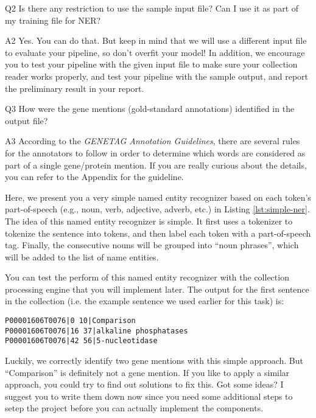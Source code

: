 \begin{qa}
\item[Q2] Is there any restriction to use the sample input file? Can I use it
as part of my training file for NER?

\item[A2] Yes. You can do that. But keep in mind that we will use a different
input file to evaluate your pipeline, so don't overfit your model! In addition,
we encourage you to test your pipeline with the given input file to make sure
your collection reader works properly, and test your pipeline with the sample
output, and report the preliminary result in your report.

\item[Q3] How were the gene mentions (gold-standard annotations) identified in
the output file?

\item[A3] According to the \emph{GENETAG Annotation Guidelines}, there are
several rules for the annotators to follow in order to determine which words are
considered as part of a single gene/protein mention. If you are really curious
about the details, you can refer to the Appendix for the guideline.

\end{qa}

Here, we present you a very simple named entity recognizer based on each token's
part-of-speech (e.g., noun, verb, adjective, adverb, etc.) in Listing
\ref{lst:simple-ner}. The idea of this named entity recognizer is simple. It
first uses a tokenizer to tokenize the sentence into tokens, and then label each
token with a part-of-speech tag. Finally, the consecutive nouns will be grouped
into ``noun phrases'', which will be added to the list of name entities.

\small

\normalsize

You can test the perform of this named entity recognizer with the collection
processing engine that you will implement later. The output for the first
sentence in the collection (i.e. the example sentence we used earlier for this
task) is:

\begin{verbatim}
P00001606T0076|0 10|Comparison
P00001606T0076|16 37|alkaline phosphatases
P00001606T0076|42 56|5-nucleotidase
\end{verbatim}

Luckily, we correctly identify two gene mentions with this simple approach. But
``Comparison'' is definitely not a gene mention. If you like to apply a similar
approach, you could try to find out solutions to fix this. Got some ideas? I
suggest you to write them down now since you need some additional steps to setep
the project before you can actually implement the components.
